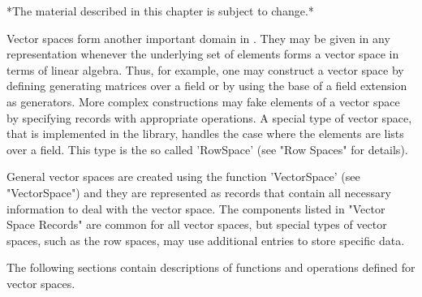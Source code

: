 

*The material described in this chapter is subject to change.*

Vector spaces form another important domain in  {\GAP}. They may be given
in  any representation whenever  the  underlying  set of elements forms a
vector  space in  terms of  linear  algebra. Thus, for  example, one  may
construct  a vector space by defining generating matrices over a field or
by using  the base  of a  field  extension  as  generators. More  complex
constructions may  fake elements of a vector space  by specifying records
with  appropriate operations.   A  special type of vector space,  that is
implemented in  the {\GAP} library,  handles the case where  the elements
are  lists over a field. This type is  the so called 'RowSpace' (see "Row
Spaces" for details).

General  vector spaces  are created using the function 'VectorSpace' (see
"VectorSpace")  and  they are  represented as  records  that contain  all
necessary information to deal  with  the  vector  space.  The  components
listed  in "Vector Space Records" are common for  all vector spaces,  but
special  types  of  vector  spaces,  such  as  the  row  spaces, may  use
additional entries to store specific data.

The following sections contain descriptions  of  functions and operations
defined for vector spaces.

